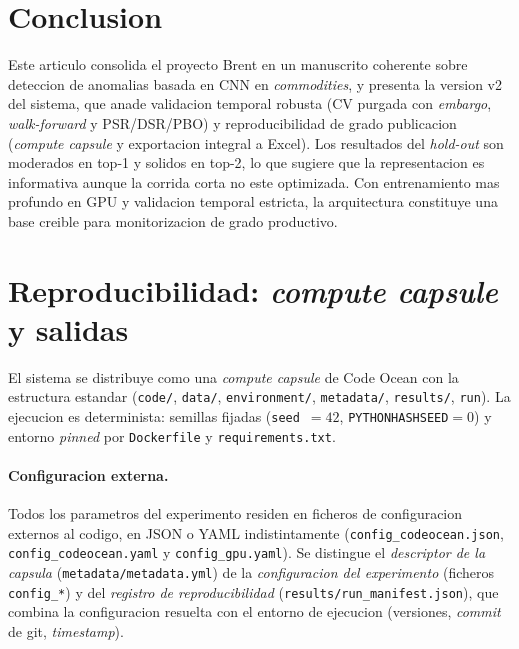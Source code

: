 \documentclass[preprint,12pt,3p]{elsarticle}
\begin{document}
\section{Conclusion}
Este articulo consolida el proyecto Brent en un manuscrito coherente sobre
deteccion de anomalias basada en CNN en \emph{commodities}, y presenta la version
v2 del sistema, que anade validacion temporal robusta (CV purgada con
\emph{embargo}, \emph{walk-forward} y PSR/DSR/PBO) y reproducibilidad de grado
publicacion (\emph{compute capsule} y exportacion integral a Excel). Los
resultados del \emph{hold-out} son moderados en top-1 y solidos en top-2, lo que
sugiere que la representacion es informativa aunque la corrida corta no este
optimizada. Con entrenamiento mas profundo en GPU y validacion temporal estricta,
la arquitectura constituye una base creible para monitorizacion de grado
productivo.

\appendix
\section{Reproducibilidad: \emph{compute capsule} y salidas}
\label{ap:repro}
El sistema se distribuye como una \emph{compute capsule} de Code Ocean con la
estructura estandar (\texttt{code/}, \texttt{data/}, \texttt{environment/},
\texttt{metadata/}, \texttt{results/}, \texttt{run}). La ejecucion es
determinista: semillas fijadas (\texttt{seed}~$=42$, \texttt{PYTHONHASHSEED}$=0$) y
entorno \emph{pinned} por \texttt{Dockerfile} y \texttt{requirements.txt}.

\paragraph{Configuracion externa.} Todos los parametros del experimento residen en
ficheros de configuracion externos al codigo, en JSON o YAML indistintamente
(\texttt{config\_codeocean.json}, \texttt{config\_codeocean.yaml} y
\texttt{config\_gpu.yaml}). Se distingue el \emph{descriptor de la capsula}
(\texttt{metadata/metadata.yml}) de la \emph{configuracion del experimento}
(ficheros \texttt{config\_*}) y del \emph{registro de reproducibilidad}
(\texttt{results/run\_manifest.json}), que combina la configuracion resuelta con el
entorno de ejecucion (versiones, \emph{commit} de git, \emph{timestamp}).
\end{document}
